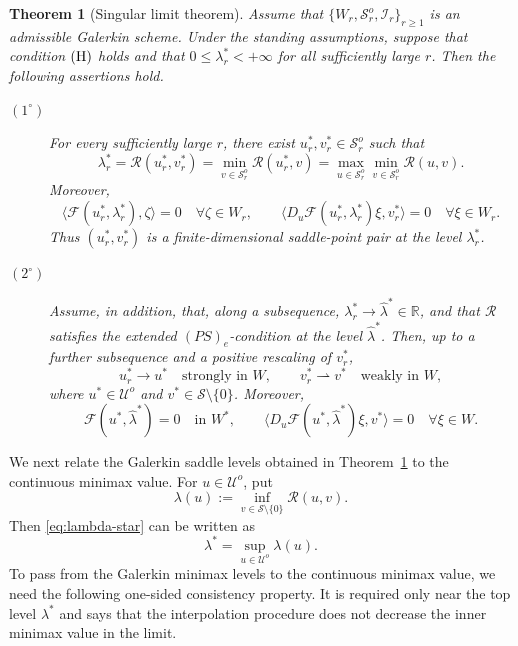 \documentclass[preprint,10pt]{elsarticle}
\numberwithin{equation}{section}
\newtheorem{thm}{Theorem}[section]
\begin{document}
\begin{thm}[Singular limit theorem]
	\label{Thm1}
	Assume that \(\{W_r,\mathcal S_r^o,\mathcal I_r\}_{r\ge1}\) is an
	admissible Galerkin scheme. Under the standing assumptions, suppose that
	condition \({\rm (H)}\) holds and that
	\(0\le\lambda_r^*<+\infty\) for all sufficiently large \(r\). Then the
	following assertions hold.
	
	\begin{description}
		\item[\((1^\circ)\)]
		For every sufficiently large \(r\), there exist
		\(u_r^*,v_r^*\in\mathcal S_r^o\) such that
		\begin{equation}\label{eq:MMth2}
			\lambda_r^*
			=
			\mathcal R(u_r^*,v_r^*)
			=
			\min_{v\in\mathcal S_r^o}\mathcal R(u_r^*,v)
			=
			\max_{u\in\mathcal S_r^o}
			\min_{v\in\mathcal S_r^o}\mathcal R(u,v).
		\end{equation}
		Moreover,
		\[
		\langle\mathcal F(u_r^*,\lambda_r^*),\zeta\rangle=0
		\quad \forall \zeta\in W_r,
		\qquad
		\bigl\langle
		D_u\mathcal F(u_r^*,\lambda_r^*)\xi,v_r^*
		\bigr\rangle=0
		\quad \forall \xi\in W_r .
		\]
		Thus \((u_r^*,v_r^*)\) is a finite-dimensional saddle-point pair at
		the level \(\lambda_r^*\).
		
		\item[\((2^\circ)\)]
		Assume, in addition, that, along a subsequence,
		\(\lambda_r^*\to\hat\lambda^*\in\mathbb R\), and that
		\(\mathcal R\) satisfies the extended \((PS)_e\)-condition at the level
		\(\hat\lambda^*\). Then, up to a further subsequence and a positive
		rescaling of \(v_r^*\),
		\[
		u_r^*\to u^* \quad\text{strongly in }W,
		\qquad
		v_r^*\rightharpoonup v^* \quad\text{weakly in }W,
		\]
		where \(u^*\in\mathcal U^o\) and
		\(v^*\in\mathcal S\setminus\{0\}\). Moreover,
		\[
		\mathcal F(u^*,\hat\lambda^*)=0
		\quad\text{in }W^*,
		\qquad
		\bigl\langle
		D_u\mathcal F(u^*,\hat\lambda^*)\xi,v^*
		\bigr\rangle=0
		\quad \forall \xi\in W .
		\]
	\end{description}
\end{thm}
\medskip

We next relate the Galerkin saddle levels obtained in Theorem~\ref{Thm1} to
the continuous minimax value. For \(u\in\mathcal U^o\), put
\[
\lambda(u):=
\inf_{v\in\mathcal S\setminus\{0\}}\mathcal R(u,v).
\]
Then \eqref{eq:lambda-star} can be written as
\[
\lambda^*=\sup_{u\in\mathcal U^o}\lambda(u).
\]
To pass from the Galerkin minimax levels to the continuous minimax value, we
need the following one-sided consistency property. It is required only near
the top level \(\lambda^*\) and says that the interpolation procedure does
not decrease the inner minimax value in the limit.
\end{document}
